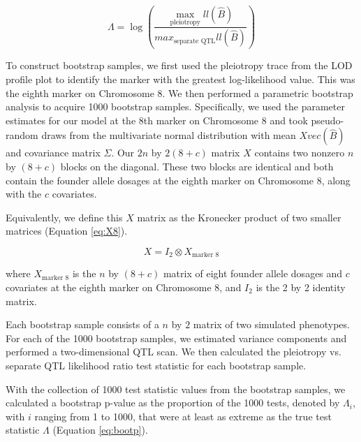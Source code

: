 \documentclass[oneside]{book}
\begin{document}
\begin{equation}
\Lambda = \log\left(\frac{\max_{\text{pleiotropy}}ll(\hat B)}{max_{\text{separate QTL}}ll(\hat B)}\right)
\end{equation}



To construct bootstrap samples, we first used the pleiotropy trace from the LOD profile plot to identify the marker with the greatest log-likelihood value. This was the eighth marker on Chromosome 8. We then performed a parametric bootstrap analysis to acquire 1000 bootstrap samples. Specifically, we used the parameter estimates for our model at the 8th marker on Chromosome 8 and took pseudo-random draws from the multivariate normal distribution with mean $Xvec(\hat B)$ and covariance matrix $\Sigma$. Our $2n$ by $2(8 + c)$ matrix $X$ contains two nonzero $n$ by $(8 + c)$ blocks on the diagonal. These two blocks are identical and both contain the founder allele dosages at the eighth marker on Chromosome 8, along with the $c$ covariates. 

Equivalently, we define this $X$ matrix as the Kronecker product of two smaller matrices (Equation \ref{eq:X8}). 

\begin{equation}
X = I_2 \otimes X_{\text{marker 8}}
\label{eq:X8}
\end{equation}

where $X_{\text{marker 8}}$ is the $n$ by $(8 + c)$ matrix of eight founder allele dosages and $c$ covariates at the eighth marker on Chromosome 8, and $I_2$ is the 2 by 2 identity matrix.

Each bootstrap sample consists of a $n$ by $2$ matrix of two simulated phenotypes. For each of the 1000 bootstrap samples, we estimated variance components and performed a two-dimensional QTL scan. We then calculated the pleiotropy vs. separate QTL likelihood ratio test statistic for each bootstrap sample.



With the collection of 1000 test statistic values from the bootstrap samples, we calculated a bootstrap p-value as the proportion of the 1000 tests, denoted by $\Lambda_i$, with $i$ ranging from 1 to 1000, that were at least as extreme as the true test statistic $\Lambda$ (Equation \ref{eq:bootp}).
\end{document}
